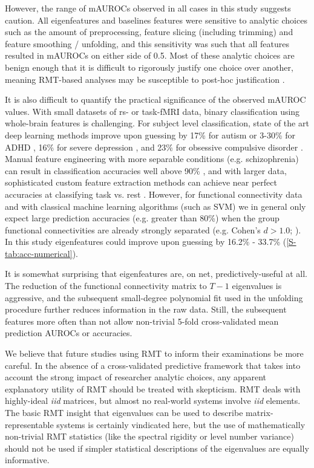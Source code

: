 \documentclass[12pt]{spieman}  %
\begin{document}
\begin{spacing}{2}
However, the range of mAUROCs observed in all cases in this study suggests
caution. All eigenfeatures and baselines features were sensitive to analytic
choices such as the amount of preprocessing, feature slicing (including trimming) and
feature smoothing / unfolding, and this sensitivity was such that all features
resulted in mAUROCs on either side of 0.5. Most of these analytic choices are benign enough that
it is difficult to rigorously justify one choice over another, meaning RMT-based
analyses may be susceptible to post-hoc justification \cite{kerrHARKingHypothesizingResults1998}.

It is also difficult to quantify the practical significance of the observed
mAUROC values. With small datasets of rs- or task-fMRI data, binary
classification using whole-brain features is challenging. For subject level
classification, state of the art deep learning methods improve upon guessing by
17\% for autism \cite{bengs4DSpatioTemporalDeep2020} or 3-30\% for ADHD
\cite{riazDeepFMRIEndtoendDeep2020}, 16\% for severe depression
\cite{ramasubbuAccuracyAutomatedClassification2016}, and 23\% for obsessive
compulsive disorder \cite{takagiNeuralMarkerObsessiveCompulsive2017}. Manual
feature engineering with more separable conditions (e.g. schizophrenia) can
result in classification accuracies well above 90\%
\cite{duHighClassificationAccuracy2012}, and with larger data, sophisticated
custom feature extraction methods can achieve near perfect accuracies at
classifying task vs. rest
\cite{zhangCharacterizingDifferentiatingTaskbased2016}. However, for functional
connectivity data and with classical machine learning algorithms (such as SVM)
we in general only expect large prediction accuracies (e.g. greater than 80\%)
when the group functional connectivities are already strongly separated (e.g.
Cohen’s \(d > 1.0\); ). In
this study eigenfeatures could improve upon guessing by 16.2\% - 33.7\%
(\ref{S-tab:acc-numerical}).

It is somewhat surprising that eigenfeatures are, on net, predictively-useful
at all. The reduction of the functional connectivity matrix to \(T - 1\)
eigenvalues is aggressive, and the subsequent small-degree polynomial fit used
in the unfolding procedure further reduces information in the raw data.
Still, the subsequent features more often than not allow non-trivial 5-fold
cross-validated mean prediction AUROCs or accuracies.

We believe that future studies using RMT to inform their examinations be more
careful. In the absence of a cross-validated predictive framework that takes
into account the strong impact of researcher analytic choices, any apparent
explanatory utility of RMT should be treated with skepticism. RMT deals with
highly-ideal \textit{iid} matrices, but almost no real-world systems involve
\textit{iid} elements. The basic RMT insight that eigenvalues can be used to
describe matrix-representable systems is certainly vindicated here, but the use
of mathematically non-trivial RMT statistics (like the spectral rigidity or
level number variance) should not be used if simpler statistical descriptions
of the eigenvalues are equally informative.


\end{spacing}
\end{document}
